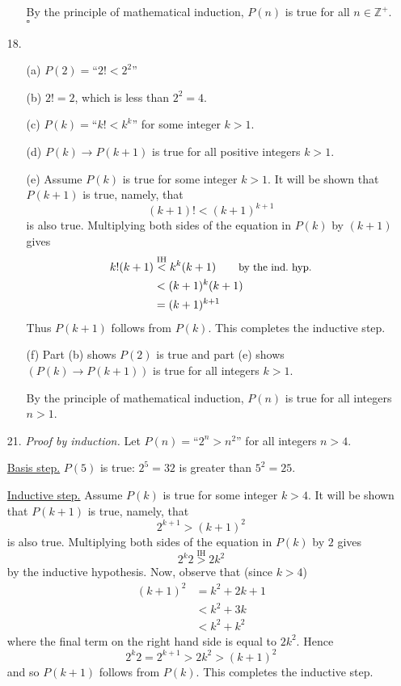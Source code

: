 \documentclass{article}
\begin{document}
\begin{enumerate}
\begin{itemize}
            By the principle of mathematical induction, $P(n)$ is true for all $n \in \mathbb{Z}^+$. $\square$
        \end{itemize}
    \item[18.]
        \begin{itemize}
            \item[(a)] $P(2) = \text{``}2! < 2^2\text{''}$
            \item[(b)] $2! = 2$, which is less than $2^2 = 4$.
            \item[(c)] $P(k) = \text{``}k! < k^k\text{''}$ for some integer $k > 1$.
            \item[(d)] $P(k) \rightarrow P(k+1)$ is true for all positive integers $k > 1$.
            \item[(e)] Assume $P(k)$ is true for some integer $k > 1$. It will be shown that $P(k+1)$ is true, namely, that
            \[
            (k+1)! < (k+1)^{k+1}
            \]
            is also true. Multiplying both sides of the equation in $P(k)$ by $(k+1)$ gives
            \begin{align*}
            k!(k+1) &\overset{\mathrm{IH}}{<} k^k (k+1)\tag*{\small{by the ind.~hyp.}}\\
            &< (k+1)^k (k+1)\\
            &= (k+1)^{k+1}
            \end{align*}
            Thus $P(k+1)$ follows from $P(k)$. This completes the inductive step.
            \item[(f)] Part (b) shows $P(2)$ is true and part (e) shows $\left( P(k) \rightarrow P(k+1) \right)$ is true for all integers $k > 1$.

            By the principle of mathematical induction, $P(n)$ is true for all integers $n > 1$.
        \end{itemize}
    \item[21.] \textit{Proof by induction.} Let $P(n) = \text{``}2^n > n^2\text{''}$ for all integers $n > 4$.

    \underline{Basis step.} $P(5)$ is true: $2^5 = 32$ is greater than $5^2 = 25$.

    \underline{Inductive step.} Assume $P(k)$ is true for some integer $k > 4$. It will be shown that $P(k+1)$ is true, namely, that
    \[
    2^{k+1} > (k+1)^2
    \]
    is also true. Multiplying both sides of the equation in $P(k)$ by $2$ gives
    \[
    2^k 2 \overset{\mathrm{IH}}{>} 2 k^2
    \]
    by the inductive hypothesis. Now, observe that (since $k>4$)
    \begin{align*}
    (k+1)^2 &= k^2 + 2k + 1\\
    &< k^2 + 3k\\
    &< k^2 + k^2
    \end{align*}
    where the final term on the right hand side is equal to $2k^2$. Hence
    \[
    2^k 2 = 2^{k+1} > 2 k^2 > (k+1)^2
    \]
    and so $P(k+1)$ follows from $P(k)$. This completes the inductive step.


\end{enumerate}
\end{document}
